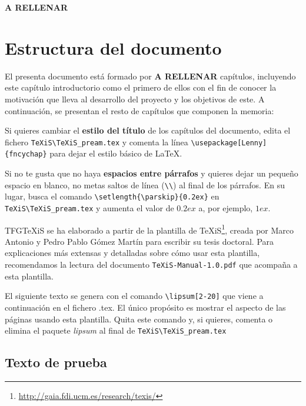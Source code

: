 \textbf{A RELLENAR} 



\section{Estructura del documento}
El presenta documento está formado por  \textbf{A RELLENAR}  capítulos, incluyendo este capítulo introductorio como el primero de ellos con el fin de conocer la motivación que lleva al desarrollo del proyecto y los objetivos de este. A continuación, se presentan el resto de capítulos que componen la memoria: 

Si quieres cambiar el \textbf{estilo del título} de los capítulos del documento, edita el fichero \verb|TeXiS\TeXiS_pream.tex| y comenta la línea \verb|\usepackage[Lenny]{fncychap}| para dejar el estilo básico de \LaTeX.

Si no te gusta que no haya \textbf{espacios entre párrafos} y quieres dejar un pequeño espacio en blanco, no metas saltos de línea (\verb|\\|) al final de los párrafos. En su lugar, busca el comando  \verb|\setlength{\parskip}{0.2ex}| en \verb|TeXiS\TeXiS_pream.tex| y aumenta el valor de $0.2ex$ a, por ejemplo, $1ex$.

TFGTeXiS se ha elaborado a partir de la plantilla de TeXiS\footnote{\url{http://gaia.fdi.ucm.es/research/texis/}}, creada por Marco Antonio y Pedro Pablo Gómez Martín para escribir su tesis doctoral. Para explicaciones más extensas y detalladas sobre cómo usar esta plantilla, recomendamos la lectura del documento \texttt{TeXiS-Manual-1.0.pdf} que acompaña a esta plantilla.

El siguiente texto se genera con el comando \verb|\lipsum[2-20]| que viene a continuación en el fichero .tex. El único propósito es mostrar el aspecto de las páginas usando esta plantilla. Quita este comando y, si quieres, comenta o elimina el paquete \textit{lipsum} al final de \verb|TeXiS\TeXiS_pream.tex|

\subsection{Texto de prueba}


\lipsum[2-20]